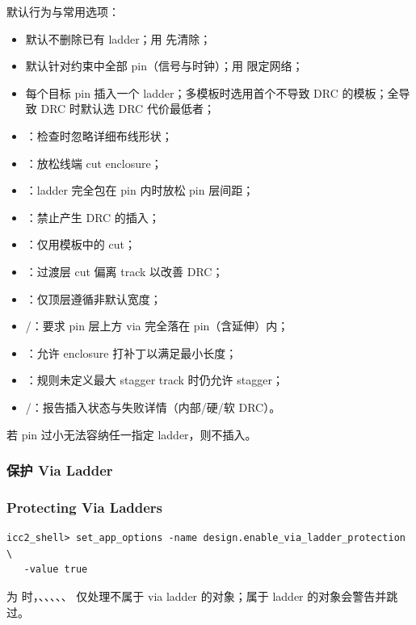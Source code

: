  默认行为与常用选项：
\begin{itemize}
  \item 默认不删除已有 ladder；用  先清除；
  \item 默认针对约束中全部 pin（信号与时钟）；用  限定网络；
  \item 每个目标 pin 插入一个 ladder；多模板时选用首个不导致 DRC 的模板；全导致 DRC 时默认选 DRC 代价最低者；
  \item {}：检查时忽略详细布线形状；
  \item {}：放松线端 cut enclosure；
  \item {}：ladder 完全包在 pin 内时放松 pin 层间距；
  \item {}：禁止产生 DRC 的插入；
  \item {}：仅用模板中的 cut；
  \item {}：过渡层 cut 偏离 track 以改善 DRC；
  \item {}：仅顶层遵循非默认宽度；
  \item {}/：要求 pin 层上方 via 完全落在 pin（含延伸）内；
  \item {}：允许 enclosure 打补丁以满足最小长度；
  \item {}：规则未定义最大 stagger track 时仍允许 stagger；
  \item {}/：报告插入状态与失败详情（内部/硬/软 DRC）。
\end{itemize}

\begin{noteBox}
若 pin 过小无法容纳任一指定 ladder，则不插入。
\end{noteBox}

\subsubsection{保护 Via Ladder}
\subsubsection*{Protecting Via Ladders}

\begin{lstlisting}
icc2_shell> set_app_options -name design.enable_via_ladder_protection \
   -value true
\end{lstlisting}
为  时，、、、、、 仅处理不属于 via ladder 的对象；属于 ladder 的对象会警告并跳过。

